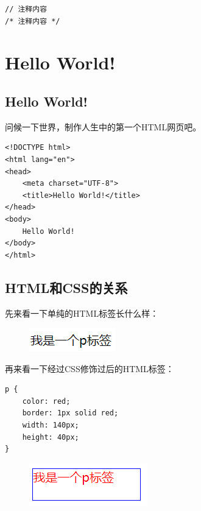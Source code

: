 \begin{lstlisting}[style=htmlcssjs, title=JavaScript注释]
// 注释内容
/* 注释内容 */
\end{lstlisting}

\newpage

\section{Hello World!}

\subsection{Hello World!}

问候一下世界，制作人生中的第一个HTML网页吧。

\begin{lstlisting}[style=htmlcssjs, title=Hello World!]
<!DOCTYPE html>
<html lang="en">
<head>
    <meta charset="UTF-8">
    <title>Hello World!</title>
</head>
<body>
    Hello World!
</body>
</html>
\end{lstlisting}

\subsection{HTML和CSS的关系}

先来看一下单纯的HTML标签长什么样：

\begin{figure}[H]
	\centering
	\includegraphics[]{img/C1/1-3/1.png}
\end{figure}

再来看一下经过CSS修饰过后的HTML标签：

\begin{lstlisting}[style=htmlcssjs, title=Hello World!]
p {
    color: red;
    border: 1px solid red;
    width: 140px;
    height: 40px;
}
\end{lstlisting}

\begin{figure}[H]
	\centering
	\includegraphics[]{img/C1/1-3/2.png}
\end{figure}

